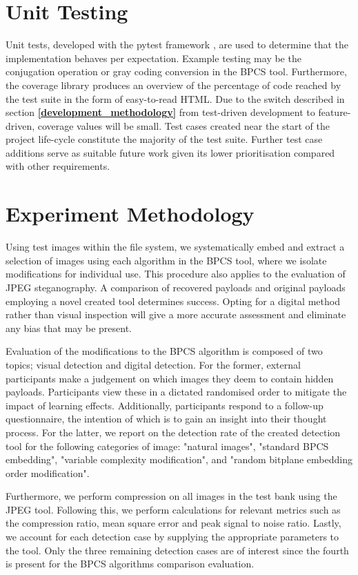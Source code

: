 \documentclass{l4proj}
\begin{document}
\section{Unit Testing}\label{unit_testing}

Unit tests, developed with the pytest framework \citep{pytest}, are used to determine that the implementation behaves per expectation.  Example testing may be the conjugation operation or gray coding conversion in the BPCS tool. Furthermore, the coverage library \citep{coverage} produces an overview of the percentage of code reached by the test suite in the form of easy-to-read HTML. Due to the switch described in section \textbf{\ref{development_methodology}} from test-driven development to feature-driven, coverage values will be small. Test cases created near the start of the project life-cycle constitute the majority of the test suite. Further test case additions serve as suitable future work given its lower prioritisation compared with other requirements.

\section{Experiment Methodology}

Using test images within the file system, we systematically embed and extract a selection of images using each algorithm in the BPCS tool, where we isolate modifications for individual use.  This procedure also applies to the evaluation of JPEG steganography. A comparison of recovered payloads and original payloads employing a novel created tool determines success. Opting for a digital method rather than visual inspection will give a more accurate assessment and eliminate any bias that may be present.

Evaluation of the modifications to the BPCS algorithm is composed of two topics; visual detection and digital detection. For the former, external participants make a judgement on which images they deem to contain hidden payloads. Participants view these in a dictated randomised order to mitigate the impact of learning effects. Additionally, participants respond to a follow-up questionnaire, the intention of which is to gain an insight into their thought process. For the latter, we report on the detection rate of the created detection tool for the following categories of image: "natural images", "standard BPCS embedding", "variable complexity modification", and "random bitplane embedding order modification".

Furthermore, we perform compression on all images in the test bank using the JPEG tool. Following this, we perform calculations for relevant metrics such as the compression ratio, mean square error and peak signal to noise ratio. Lastly, we account for each detection case by supplying the appropriate parameters to the tool. Only the three remaining detection cases are of interest since the fourth is present for the BPCS algorithms comparison evaluation. 
\end{document}
